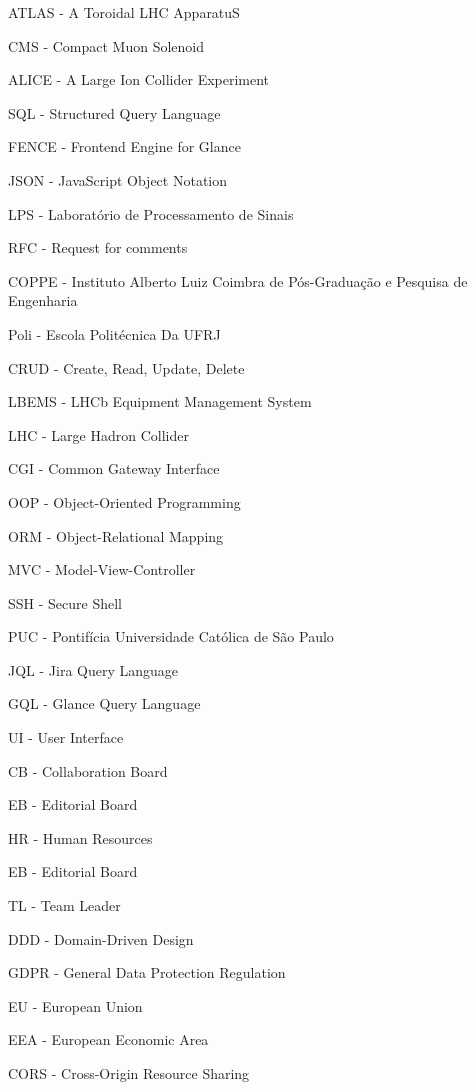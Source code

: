 \noindent ATLAS - A Toroidal LHC ApparatuS

\noindent CMS - Compact Muon Solenoid

\noindent ALICE - A Large Ion Collider Experiment

\noindent SQL - Structured Query Language

\noindent FENCE - Frontend Engine for Glance

\noindent JSON - JavaScript Object Notation

\noindent LPS - Laboratório de Processamento de Sinais

\noindent RFC - Request for comments

\noindent COPPE - Instituto Alberto Luiz Coimbra de Pós-Graduação e Pesquisa de Engenharia

\noindent Poli - Escola Politécnica Da UFRJ

\noindent CRUD - Create, Read, Update, Delete

\noindent LBEMS - LHCb Equipment Management System

\noindent LHC - Large Hadron Collider

\noindent CGI - Common Gateway Interface

\noindent OOP - Object-Oriented Programming

\noindent ORM - Object-Relational Mapping

\noindent MVC - Model-View-Controller

\noindent SSH - Secure Shell

\noindent PUC - Pontifícia Universidade Católica de São Paulo

\noindent JQL - Jira Query Language

\noindent GQL - Glance Query Language

\noindent UI - User Interface

\noindent CB - Collaboration Board

\noindent EB - Editorial Board

\noindent HR - Human Resources

\noindent EB - Editorial Board

\noindent TL - Team Leader

\noindent DDD -  Domain-Driven Design

\noindent GDPR - General Data Protection Regulation

\noindent EU - European Union

\noindent EEA - European Economic Area

\noindent CORS - Cross-Origin Resource Sharing

